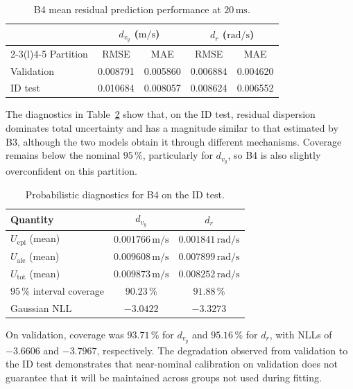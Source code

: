 \documentclass[12pt,a4paper]{report}
\begin{document}
\begin{table}[htbp]
    \centering
    \caption{B4 mean residual prediction performance at $20\,\mathrm{ms}$.}
    \label{tab:b4_residual_performance}
    \begin{tabular}{@{}lcccc@{}}
        \toprule
        & \multicolumn{2}{c}{$d_{v_y}$ ($\mathrm{m/s}$)}
        & \multicolumn{2}{c}{$d_r$ ($\mathrm{rad/s}$)} \\
        \cmidrule(lr){2-3}\cmidrule(l){4-5}
        Partition & RMSE & MAE & RMSE & MAE \\
        \midrule
        Validation & 0.008791 & 0.005860 & 0.006884 & 0.004620 \\
        ID test  & 0.010684 & 0.008057 & 0.008624 & 0.006552 \\
        \bottomrule
    \end{tabular}
\end{table}

The diagnostics in Table~\ref{tab:b4_uncertainty_diagnostics} show that, on the ID test, residual dispersion dominates total uncertainty and has a magnitude similar to that estimated by B3, although the two models obtain it through different mechanisms. Coverage remains below the nominal $95$\,\%, particularly for $d_{v_y}$, so B4 is also slightly overconfident on this partition.

\begin{table}[htbp]
    \centering
    \caption{Probabilistic diagnostics for B4 on the ID test.}
    \label{tab:b4_uncertainty_diagnostics}
    \begin{tabular}{@{}lcc@{}}
        \toprule
        Quantity & $d_{v_y}$ & $d_r$ \\
        \midrule
        $U_{\mathrm{epi}}$ (mean)
            & $0.001766\,\mathrm{m/s}$ & $0.001841\,\mathrm{rad/s}$ \\
        $U_{\mathrm{ale}}$ (mean)
            & $0.009608\,\mathrm{m/s}$ & $0.007899\,\mathrm{rad/s}$ \\
        $U_{\mathrm{tot}}$ (mean)
            & $0.009873\,\mathrm{m/s}$ & $0.008252\,\mathrm{rad/s}$ \\
        $95$\,\% interval coverage
            & $90.23$\,\% & $91.88$\,\% \\
        Gaussian NLL
            & $-3.0422$ & $-3.3273$ \\
        \bottomrule
    \end{tabular}
\end{table}

On validation, coverage was $93.71$\,\% for $d_{v_y}$ and $95.16$\,\% for $d_r$, with NLLs of $-3.6606$ and $-3.7967$, respectively. The degradation observed from validation to the ID test demonstrates that near-nominal calibration on validation does not guarantee that it will be maintained across groups not used during fitting.
\end{document}
